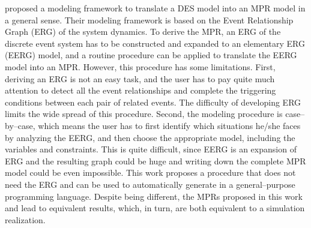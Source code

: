 \documentclass[]{interact}
\theoremstyle{plain}%
\theoremstyle{definition}
\theoremstyle{remark}
\begin{document}

\cite{chan2008optimization} proposed a modeling framework to translate a DES model into an MPR model in a general sense. Their modeling framework is based on the Event Relationship Graph (ERG) of the system dynamics. To derive the MPR, %
an ERG of the discrete event system has to be constructed and expanded to an elementary ERG (EERG) model, and a routine procedure can be applied to translate the EERG model into an MPR. %
However, this procedure has some limitations. First, deriving an ERG is not an easy task, and the user has to pay quite much attention to detect all the event relationships and complete the triggering conditions between each pair of related events. %
The difficulty of developing ERG limits the wide spread of this procedure. 
Second, the modeling procedure is case--by--case, which means the user has to first identify which situations he/she faces by analyzing the EERG, and then choose the appropriate model, including the variables and constraints. This is quite %
difficult, since EERG is an expansion of ERG and the resulting graph could be huge and writing down the complete MPR model could be even impossible.  This work proposes a procedure that does not need %
the ERG and %
can be used to automatically generate in a general--purpose programming language. Despite %
being different, the MPRs proposed in this work and \cite{chan2008optimization} lead to %
equivalent results, which, in turn, are both equivalent to a simulation realization.
\end{document}
